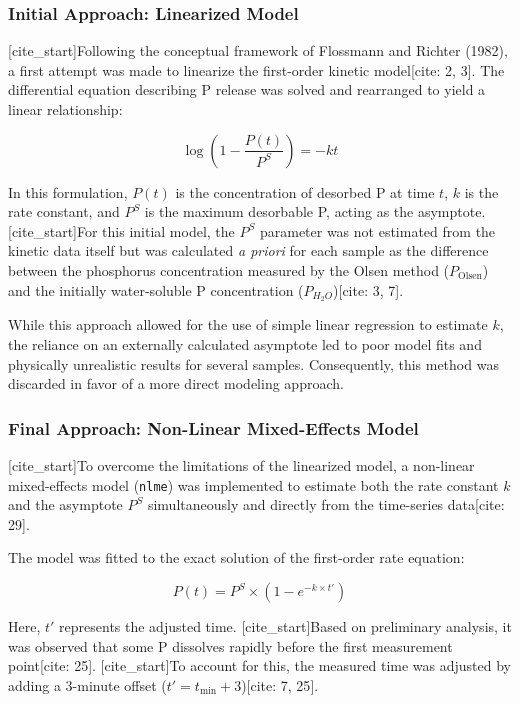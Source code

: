 \documentclass[
  letterpaper,
  DIV=11,
  numbers=noendperiod]{scrartcl}
\begin{document}
\subsubsection{Initial Approach: Linearized
Model}\label{initial-approach-linearized-model}

{[}cite\_start{]}Following the conceptual framework of Flossmann and
Richter (1982), a first attempt was made to linearize the first-order
kinetic model{[}cite: 2, 3{]}. The differential equation describing P
release was solved and rearranged to yield a linear relationship:

\[ \log\left(1 - \frac{P(t)}{P^S}\right) = -kt \]

In this formulation, \(P(t)\) is the concentration of desorbed P at time
\(t\), \(k\) is the rate constant, and \(P^S\) is the maximum desorbable
P, acting as the asymptote. {[}cite\_start{]}For this initial model, the
\(P^S\) parameter was not estimated from the kinetic data itself but was
calculated \emph{a priori} for each sample as the difference between the
phosphorus concentration measured by the Olsen method
(\(P_\text{Olsen}\)) and the initially water-soluble P concentration
(\(P_{H_2O}\)){[}cite: 3, 7{]}.

While this approach allowed for the use of simple linear regression to
estimate \(k\), the reliance on an externally calculated asymptote led
to poor model fits and physically unrealistic results for several
samples. Consequently, this method was discarded in favor of a more
direct modeling approach.

\subsubsection{Final Approach: Non-Linear Mixed-Effects
Model}\label{final-approach-non-linear-mixed-effects-model}

{[}cite\_start{]}To overcome the limitations of the linearized model, a
non-linear mixed-effects model (\texttt{nlme}) was implemented to
estimate both the rate constant \(k\) and the asymptote \(P^S\)
simultaneously and directly from the time-series data{[}cite: 29{]}.

The model was fitted to the exact solution of the first-order rate
equation:

\[ P(t) = P^S \times (1 - e^{-k \times t'}) \]

Here, \(t'\) represents the adjusted time. {[}cite\_start{]}Based on
preliminary analysis, it was observed that some P dissolves rapidly
before the first measurement point{[}cite: 25{]}. {[}cite\_start{]}To
account for this, the measured time was adjusted by adding a 3-minute
offset (\(t' = t_\text{min} + 3\)){[}cite: 7, 25{]}.
\end{document}
